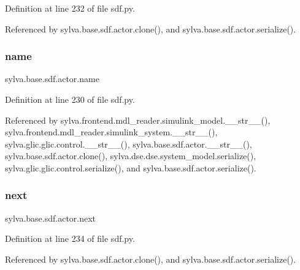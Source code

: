 Definition at line 232 of file sdf.\+py.



Referenced by sylva.\+base.\+sdf.\+actor.\+clone(), and sylva.\+base.\+sdf.\+actor.\+serialize().

\mbox{\label{classsylva_1_1base_1_1sdf_1_1actor_a2ef1df32bd9d891a43df5b59cdc2f33b}} 
\subsubsection{\texorpdfstring{name}{name}}
{\footnotesize\ttfamily sylva.\+base.\+sdf.\+actor.\+name}



Definition at line 230 of file sdf.\+py.



Referenced by sylva.\+frontend.\+mdl\+\_\+reader.\+simulink\+\_\+model.\+\_\+\+\_\+str\+\_\+\+\_\+(), sylva.\+frontend.\+mdl\+\_\+reader.\+simulink\+\_\+system.\+\_\+\+\_\+str\+\_\+\+\_\+(), sylva.\+glic.\+glic.\+control.\+\_\+\+\_\+str\+\_\+\+\_\+(), sylva.\+base.\+sdf.\+actor.\+\_\+\+\_\+str\+\_\+\+\_\+(), sylva.\+base.\+sdf.\+actor.\+clone(), sylva.\+dse.\+dse.\+system\+\_\+model.\+serialize(), sylva.\+glic.\+glic.\+control.\+serialize(), and sylva.\+base.\+sdf.\+actor.\+serialize().

\mbox{\label{classsylva_1_1base_1_1sdf_1_1actor_aa182473926fcf5c58d284b5f23351629}} 
\subsubsection{\texorpdfstring{next}{next}}
{\footnotesize\ttfamily sylva.\+base.\+sdf.\+actor.\+next}



Definition at line 234 of file sdf.\+py.



Referenced by sylva.\+base.\+sdf.\+actor.\+clone(), and sylva.\+base.\+sdf.\+actor.\+serialize().

\mbox{\label{classsylva_1_1base_1_1sdf_1_1actor_aa145dfb1abe65febe991235fb715f44e}} 
